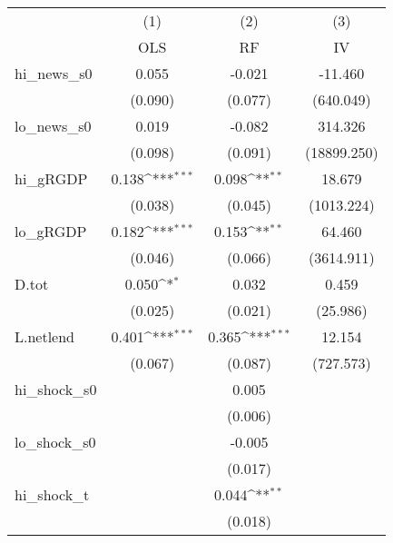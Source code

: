 {
\def\sym#1{\ifmmode^{#1}\else\(^{#1}\)\fi}
\begin{tabular}{l*{3}{c}}
\toprule
            &\multicolumn{1}{c}{(1)}&\multicolumn{1}{c}{(2)}&\multicolumn{1}{c}{(3)}\\
            &\multicolumn{1}{c}{OLS}&\multicolumn{1}{c}{RF}&\multicolumn{1}{c}{IV}\\
\midrule
hi\_news\_s0  &       0.055         &      -0.021         &     -11.460         \\
            &     (0.090)         &     (0.077)         &   (640.049)         \\
\addlinespace
lo\_news\_s0  &       0.019         &      -0.082         &     314.326         \\
            &     (0.098)         &     (0.091)         & (18899.250)         \\
\addlinespace
hi\_gRGDP    &       0.138\sym{***}&       0.098\sym{**} &      18.679         \\
            &     (0.038)         &     (0.045)         &  (1013.224)         \\
\addlinespace
lo\_gRGDP    &       0.182\sym{***}&       0.153\sym{**} &      64.460         \\
            &     (0.046)         &     (0.066)         &  (3614.911)         \\
\addlinespace
D.tot       &       0.050\sym{*}  &       0.032         &       0.459         \\
            &     (0.025)         &     (0.021)         &    (25.986)         \\
\addlinespace
L.netlend   &       0.401\sym{***}&       0.365\sym{***}&      12.154         \\
            &     (0.067)         &     (0.087)         &   (727.573)         \\
\addlinespace
hi\_shock\_s0 &                     &       0.005         &                     \\
            &                     &     (0.006)         &                     \\
\addlinespace
lo\_shock\_s0 &                     &      -0.005         &                     \\
            &                     &     (0.017)         &                     \\
\addlinespace
hi\_shock\_t  &                     &       0.044\sym{**} &                     \\
            &                     &     (0.018)         &                     \\

\end{tabular}}
